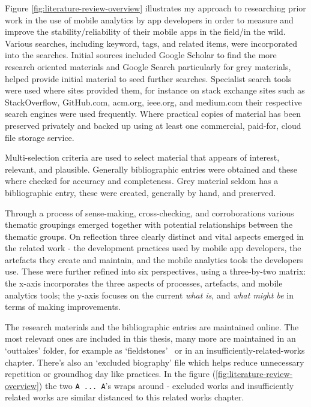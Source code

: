 Figure \ref{fig:literature-review-overview} illustrates my approach to researching prior work in the use of mobile analytics by app developers in order to measure and improve the stability/reliability of their mobile apps in the field/in the wild. Various searches, including keyword, tags, and related items, were incorporated into the searches. Initial sources included Google Scholar to find the more research oriented materials and Google Search particularly for grey materials, helped provide initial material to seed further searches. Specialist search tools were used where sites provided them, for instance on stack exchange sites such as StackOverflow, GitHub.com, acm.org, ieee.org, and medium.com their respective search engines were used frequently. Where practical copies of material has been preserved privately and backed up using at least one commercial, paid-for, cloud file storage service.

Multi-selection criteria are used to select material that appears of interest, relevant, and plausible. Generally bibliographic entries were obtained and these where checked for accuracy and completeness. Grey material seldom has a bibliographic entry, these were created, generally by hand, and preserved.

Through a process of sense-making, cross-checking, and corroborations various thematic groupings emerged together with potential relationships between the thematic groups. On reflection three clearly distinct and vital aspects emerged in the related work - the development practices used by mobile app developers, the artefacts they create and maintain, and the mobile analytics tools the developers use. These were further refined into six perspectives, using a three-by-two matrix: the x-axis incorporates the three aspects of processes, artefacts, and mobile analytics tools; the y-axis focuses on the current \emph{what is}, and \emph{what might be} in terms of making improvements.

The research materials and the bibliographic entries are maintained online. The most relevant ones are included in this thesis, many more are maintained in an `outtakes' folder, for example as `fieldstones'~\citep{weinberg2006weinberg} or in an insufficiently-related-works chapter. There's also an `excluded biography' file which helps reduce unnecessary repetition or groundhog day like practices. In the figure (\ref{fig:literature-review-overview}) the two \texttt{A ... A}'s wraps around - excluded works and insufficiently related works are similar distanced to this related works chapter.


